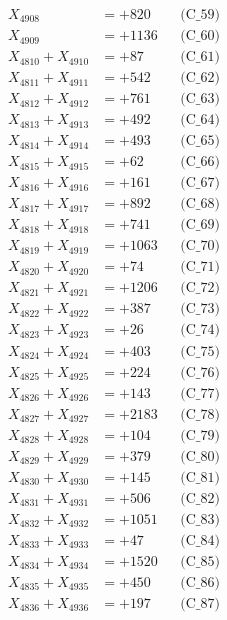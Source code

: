 \documentclass[a4paper,10pt]{article}
\begin{document}
{\begin{align}
X_{4908} &= +820 && \text{(C\_59)} \\
X_{4909} &= +1136 && \text{(C\_60)} \\
\allowbreak
X_{4810} + X_{4910} &= +87 && \text{(C\_61)} \\
X_{4811} + X_{4911} &= +542 && \text{(C\_62)} \\
X_{4812} + X_{4912} &= +761 && \text{(C\_63)} \\
X_{4813} + X_{4913} &= +492 && \text{(C\_64)} \\
X_{4814} + X_{4914} &= +493 && \text{(C\_65)} \\
\allowbreak
X_{4815} + X_{4915} &= +62 && \text{(C\_66)} \\
X_{4816} + X_{4916} &= +161 && \text{(C\_67)} \\
X_{4817} + X_{4917} &= +892 && \text{(C\_68)} \\
X_{4818} + X_{4918} &= +741 && \text{(C\_69)} \\
X_{4819} + X_{4919} &= +1063 && \text{(C\_70)} \\
\allowbreak
X_{4820} + X_{4920} &= +74 && \text{(C\_71)} \\
X_{4821} + X_{4921} &= +1206 && \text{(C\_72)} \\
X_{4822} + X_{4922} &= +387 && \text{(C\_73)} \\
X_{4823} + X_{4923} &= +26 && \text{(C\_74)} \\
X_{4824} + X_{4924} &= +403 && \text{(C\_75)} \\
\allowbreak
X_{4825} + X_{4925} &= +224 && \text{(C\_76)} \\
X_{4826} + X_{4926} &= +143 && \text{(C\_77)} \\
X_{4827} + X_{4927} &= +2183 && \text{(C\_78)} \\
X_{4828} + X_{4928} &= +104 && \text{(C\_79)} \\
X_{4829} + X_{4929} &= +379 && \text{(C\_80)} \\
\allowbreak
X_{4830} + X_{4930} &= +145 && \text{(C\_81)} \\
X_{4831} + X_{4931} &= +506 && \text{(C\_82)} \\
X_{4832} + X_{4932} &= +1051 && \text{(C\_83)} \\
X_{4833} + X_{4933} &= +47 && \text{(C\_84)} \\
X_{4834} + X_{4934} &= +1520 && \text{(C\_85)} \\
\allowbreak
X_{4835} + X_{4935} &= +450 && \text{(C\_86)} \\
X_{4836} + X_{4936} &= +197 && \text{(C\_87)} \\

\end{align}}
\end{document}
